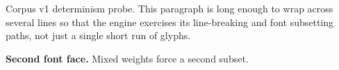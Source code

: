 \documentclass[10pt]{article}
\begin{document}
\noindent Corpus v1 determinism probe. This paragraph is long enough to wrap
across several lines so that the engine exercises its line-breaking and font
subsetting paths, not just a single short run of glyphs.

\noindent\textbf{Second font face.} Mixed weights force a second subset.
\end{document}
